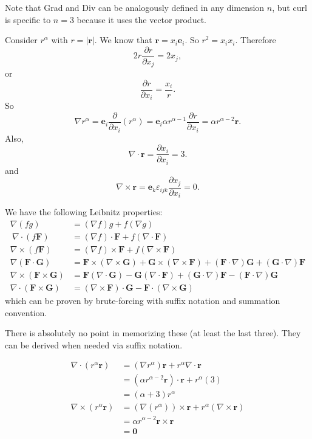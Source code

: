 \documentclass[a4paper]{article}
\begin{document}
Note that Grad and Div can be analogously defined in any dimension $n$, but curl is specific to $n = 3$ because it uses the vector product.

\begin{eg}
  Consider $r^\alpha$ with $r = |\mathbf{r}|$. We know that $\mathbf{r}= x_i\mathbf{e}_i$. So $r^2 = x_ix_i$. Therefore
  \[
    2r\frac{\partial r}{\partial x_j} = 2x_j,
  \]
  or
  \[
    \frac{\partial r}{\partial x_i} = \frac{x_i}{r}.
  \]
  So
  \[
    \nabla r^\alpha = \mathbf{e}_i \frac{\partial}{\partial x_i}(r^\alpha) = \mathbf{e}_i\alpha r^{\alpha - 1}\frac{\partial r}{\partial x_i} = \alpha r^{\alpha - 2}\mathbf{r}.
  \]
  Also,
  \[
    \nabla\cdot \mathbf{r} = \frac{\partial x_i}{\partial x_i} = 3.
  \]
  and
  \[
    \nabla \times \mathbf{r} = \mathbf{e}_k \varepsilon_{ijk}\frac{\partial x_j}{\partial x_i} = 0.
  \]
\end{eg}

\begin{prop}
  We have the following Leibnitz properties:
  \begin{align*}
    \nabla(fg) &= (\nabla f)g + f(\nabla g)\\\
    \nabla\cdot (f\mathbf{F}) &= (\nabla f)\cdot \mathbf{F} + f(\nabla\cdot \mathbf{F})\\
    \nabla\times (f\mathbf{F}) &= (\nabla f)\times \mathbf{F} + f(\nabla\times \mathbf{F})\\
    \nabla(\mathbf{F}\cdot \mathbf{G}) &= \mathbf{F}\times (\nabla \times \mathbf{G}) + \mathbf{G}\times (\nabla \times \mathbf{F}) + (\mathbf{F}\cdot \nabla)\mathbf{G} + (\mathbf{G}\cdot \nabla) \mathbf{F}\\
    \nabla \times (\mathbf{F}\times \mathbf{G}) &= \mathbf{F}(\nabla\cdot \mathbf{G}) - \mathbf{G}(\nabla\cdot \mathbf{F}) + (\mathbf{G}\cdot \nabla)\mathbf{F} - (\mathbf{F}\cdot \nabla)\mathbf{G}\\
    \nabla\cdot (\mathbf{F}\times \mathbf{G}) &= (\nabla\times \mathbf{F})\cdot \mathbf{G} - \mathbf{F}\cdot (\nabla\times \mathbf{G})
  \end{align*}
  which can be proven by brute-forcing with suffix notation and summation convention.
\end{prop}

There is absolutely no point in memorizing these (at least the last three). They can be derived when needed via suffix notation.
\begin{eg}
  \begin{align*}
    \nabla\cdot (r^\alpha \mathbf{r}) &= (\nabla r^\alpha)\mathbf{r} + r^\alpha \nabla\cdot \mathbf{r}\\
    &= (\alpha r^{\alpha - 2}\mathbf{r})\cdot \mathbf{r} + r^\alpha (3)\\
    &= (\alpha + 3)r^\alpha\\
    \nabla\times (r^\alpha \mathbf{r}) &= (\nabla(r^\alpha))\times \mathbf{r} + r^\alpha(\nabla\times \mathbf{r})\\
    &= \alpha r^{\alpha - 2} \mathbf{r}\times \mathbf{r}\\
    &= \mathbf{0}
  \end{align*}
\end{eg}
\end{document}
